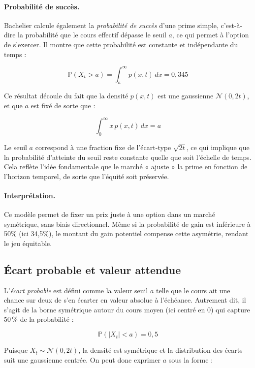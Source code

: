 \documentclass[12pt,a4paper]{article}
\begin{document}
\paragraph{Probabilité de succès.}

Bachelier calcule également la \textit{probabilité de succès} d’une prime simple, c’est-à-dire la probabilité que le cours effectif dépasse le seuil \( a \), ce qui permet à l’option de s’exercer. Il montre que cette probabilité est constante et indépendante du temps :

\[
\mathbb{P}(X_t > a) = \int_a^{\infty} p(x,t)\, dx = 0{,}345
\]

Ce résultat découle du fait que la densité \( p(x,t) \) est une gaussienne \( \mathcal{N}(0, 2t) \), et que \( a \) est fixé de sorte que :

\[
\int_0^{\infty} x\, p(x,t)\, dx = a
\]

Le seuil \( a \) correspond à une fraction fixe de l'écart-type \( \sqrt{2t} \), ce qui implique que la probabilité d’atteinte du seuil reste constante quelle que soit l’échelle de temps. Cela reflète l’idée fondamentale que le marché « ajuste » la prime en fonction de l’horizon temporel, de sorte que l’équité soit préservée.

\paragraph{Interprétation.}

Ce modèle permet de fixer un prix juste à une option dans un marché symétrique, sans biais directionnel. Même si la probabilité de gain est inférieure à 50\% (ici 34,5\%), le montant du gain potentiel compense cette asymétrie, rendant le jeu équitable.

\subsection{Écart probable et valeur attendue}

L’\textit{écart probable} est défini comme la valeur seuil \( a \) telle que le cours ait une chance sur deux de s’en écarter en valeur absolue à l’échéance. Autrement dit, il s’agit de la borne symétrique autour du cours moyen (ici centré en 0) qui capture 50\,\% de la probabilité :

\[
\mathbb{P}(|X_t| < a) = 0{,}5
\]

Puisque \( X_t \sim \mathcal{N}(0, 2t) \), la densité est symétrique et la distribution des écarts suit une gaussienne centrée. On peut donc exprimer \( a \) sous la forme :
\end{document}
